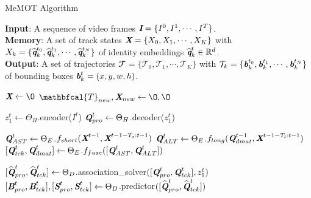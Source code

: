 \begin{algorithm}
    \small
    \caption{MeMOT Algorithm}
    \hspace*{\algorithmicindent} \textbf{Input}: A sequence of video frames $\textbf{\em I} = \{I^0, I^1, \cdots, I^T\}$.\\
    \hspace*{\algorithmicindent} \textbf{Memory}: A set of track states $\textbf{\em X} = \{X_0, X_1, \cdots, X_K\}$ with $X_k = \{\widehat{\textbf{\em q}}_k^{t_0}, \widehat{\textbf{\em q}}_k^{t_1}, \cdots, \widehat{\textbf{\em q}}_k^{t_N}\}$ of identity embeddings $\widehat{\textbf{\em q}}_k^t \in \mathbb{R}^d$.\\
    \hspace*{\algorithmicindent} \textbf{Output}: A set of trajectories $\mathbfcal{T} = \{\mathcal{T}_0, \mathcal{T}_1, \cdots, \mathcal{T}_K\}$ with $\mathcal{T}_k = \{\textbf{\em b}_k^{t_0}, \textbf{\em b}_k^{t_1}, \cdots, \textbf{\em b}_k^{t_N}\}$ of bounding boxes $\textbf{\em b}_k^{t} = (x, y, w, h)$.
    \begin{algorithmic}[1]
    \State $\mathbi{X} \leftarrow \O$
        \State $\mathbfcal{T}_{new}, \mathbi{X}_{new} \leftarrow \O, \O$
        
        \State $z_1^t \leftarrow \Theta_H$.encoder($I^t$)
        \State $\textbf{\em Q}_{pro}^t \leftarrow \Theta_H$.decoder($z_1^t$)
        
        \State $\textbf{\em Q}^t_{AST} \leftarrow \Theta_E$.$f_{short}(\textbf{\em X}^{t-1}, \textbf{\em X}^{t-1-T_s:t-1})$
        \State $\textbf{\em Q}^t_{ALT} \leftarrow \Theta_E$.$f_{long}(\textbf{\em Q}_{dmat}^{t-1}, \textbf{\em X}^{t-1-T_l:t-1})$
        \State $[\textbf{\em Q}_{tck}^t, \textbf{\em Q}_{dmat}^{t}] \leftarrow \Theta_E$.$f_{fuse}([\textbf{\em Q}^t_{AST}, \textbf{\em Q}^t_{ALT}])$
        
        \State $[\widehat{\textbf{\em Q}}_{pro}^t, \widehat{\textbf{\em Q}}_{tck}^t] \leftarrow \Theta_D$.association\_solver$([\textbf{\em Q}_{pro}^t, \textbf{\em Q}_{tck}^{t}], z_1^t)$
        \State $[\textbf{\em B}^t_{pro}, \textbf{\em B}^t_{tck}], [\textbf{\em S}^t_{pro}, \textbf{\em S}^t_{tck}] \leftarrow \Theta_D$.predictor$([\widehat{\textbf{\em Q}}_{pro}^t, \widehat{\textbf{\em Q}}_{tck}^t])$
        

\end{algorithmic}
\end{algorithm}

